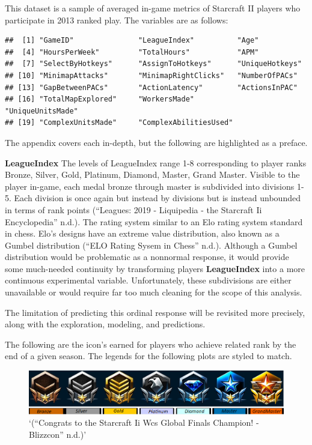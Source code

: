 \documentclass[]{article}
\begin{document}
This dataset is a sample of averaged in-game metrics of Starcraft II
players who participate in 2013 ranked play. The variables are as
follows:

\begin{verbatim}
##  [1] "GameID"               "LeagueIndex"          "Age"                 
##  [4] "HoursPerWeek"         "TotalHours"           "APM"                 
##  [7] "SelectByHotkeys"      "AssignToHotkeys"      "UniqueHotkeys"       
## [10] "MinimapAttacks"       "MinimapRightClicks"   "NumberOfPACs"        
## [13] "GapBetweenPACs"       "ActionLatency"        "ActionsInPAC"        
## [16] "TotalMapExplored"     "WorkersMade"          "UniqueUnitsMade"     
## [19] "ComplexUnitsMade"     "ComplexAbilitiesUsed"
\end{verbatim}

The appendix covers each in-depth, but the following are highlighted as
a preface.

\textbf{LeagueIndex} The levels of LeagueIndex range 1-8 corresponding
to player ranks Bronze, Silver, Gold, Platinum, Diamond, Master, Grand
Master. Visible to the player in-game, each medal bronze through master
is subdivided into divisions 1-5. Each division is once again but
instead by divisions but is instead unbounded in terms of rank points
(``Leagues: 2019 - Liquipedia - the Starcraft Ii Encyclopedia'' n.d.).
The rating system similar to an Elo rating system standard in chess.
Elo's designs have an extreme value distribution, also known as a Gumbel
distribution (``ELO Rating Sysem in Chess'' n.d.). Although a Gumbel
distribution would be problematic as a nonnormal response, it would
provide some much-needed continuity by transforming players
\textbf{LeagueIndex} into a more continuous experimental variable.
Unfortunately, these subdivisions are either unavailable or would
require far too much cleaning for the scope of this analysis.

The limitation of predicting this ordinal response will be revisited
more precisely, along with the exploration, modeling, and predictions.

The following are the icon's earned for players who achieve related rank
by the end of a given season. The legends for the following plots are
styled to match.

\begin{figure}
\centering
\includegraphics{./inline/StarCraft-II-Leagues.png}
\caption{`(``Congrats to the Starcraft Ii Wcs Global Finals Champion! -
Blizzcon'' n.d.)'}
\end{figure}
\end{document}
